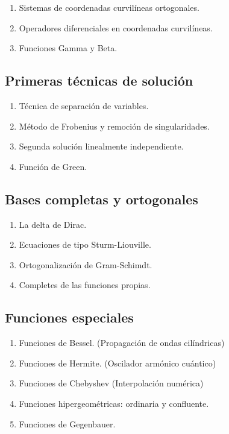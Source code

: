 \begin{enumerate}[label=4.1.\arabic*]
\item Sistemas de coordenadas curvilíneas ortogonales.
\item Operadores diferenciales en coordenadas curvilíneas.
\item Funciones Gamma y Beta.
\end{enumerate}

\subsection{Primeras técnicas de solución}

\begin{enumerate}[label=4.2.\arabic*]
\item Técnica de separación de variables.
\item Método de Frobenius y remoción de singularidades.
\item Segunda solución linealmente independiente.
\item Función de Green.
\end{enumerate}

\subsection{Bases completas y ortogonales}

\begin{enumerate}[label=4.3.\arabic*]
\item La delta de Dirac. 
\item Ecuaciones de tipo Sturm-Liouville.
\item Ortogonalización de Gram-Schimdt.
\item Completes de las funciones propias.
\end{enumerate}

\subsection{Funciones especiales}

\begin{enumerate}[label=4.4.\arabic*]
\item Funciones de Bessel. (Propagación de ondas cilíndricas)
\item Funciones de Hermite. (Oscilador armónico cuántico)
\item Funciones de Chebyshev (Interpolación numérica)
\item Funciones hipergeométricas: ordinaria y confluente.
\item Funciones de Gegenbauer.
\end{enumerate}

